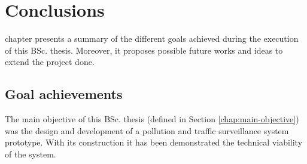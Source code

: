 \chapter{Conclusions}
\label{chap:conclusions} 

 chapter presents a summary of the different goals achieved during the execution of this \ac{BSc.} thesis. Moreover, it proposes possible future works and ideas to extend the project done.


\section{Goal achievements}

The main objective of this \ac{BSc.} thesis (defined in Section \ref{chap:main-objective}) was the design and development of a pollution and traffic surveillance system prototype. With its construction it has been demonstrated the technical viability of the system.

